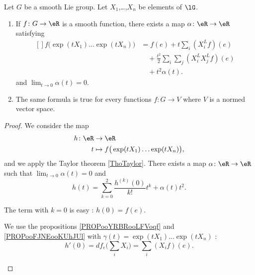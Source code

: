 \begin{theorem}
\begin{proposition}	\label{PROPooGTJLooSuAVGX}
	Let \( G\) be a smooth Lie group. Let \( X_1\),\ldots,\( X_n\) be elements of \( \lG\).
	\begin{enumerate}
		\item
		      If \(f \colon G\to \eR  \) is a smooth function, there exists a map \(\alpha \colon \eR\to \eR  \) satisfying
		      \begin{equation}		\label{EQooFQVUooXOMqEK}
			      \begin{aligned}[]
				      f\big( \exp(tX_1)\ldots \exp(tX_n) \big) & =f(e)+t\sum_i(X_i^Lf)(e)                             \\
				                                               & \quad+\frac{ t^2 }{ 2 } \sum_i\sum_j(X_i^LX_j^Lf)(e) \\
				                                               & \quad+t^2\alpha(t).
			      \end{aligned}
		      \end{equation}
		      and \( \lim_{t\to 0}\alpha(t)=0\).
		\item		\label{ITEMooQQOGooBhgChO}
		      The same formula is true for every functions \(f \colon G\to V  \) where \( V\) is a normed vector space.
	\end{enumerate}
\end{proposition}

\begin{proof}
	We consider the map
	\begin{equation}
		\begin{aligned}
			h\colon \eR & \to \eR                                           \\
			t           & \mapsto f\big( \exp(tX_1)\ldots \exp(tX_n) \big),
		\end{aligned}
	\end{equation}
	and we apply the Taylor theorem \ref{ThoTaylor}. There exists a map \(\alpha \colon \eR\to \eR  \) such that \( \lim_{t\to 0}\alpha(t)=0\) and
	\begin{equation}
		h(t)=\sum_{k=0}^2\frac{ h^{(k)}(0) }{ k! }t^k+\alpha(t)t^2.
	\end{equation}

	\begin{subproof}
		\spitem[Term \( k=0\)]
		The term with \( k=0\) is easy : \( h(0)=f(e)\).

		\spitem[Term \( k=1\)]
		We use the propositions \ref{PROPooYRBRooLFVoqf} and \ref{PROPooFJNEooKUhJUl} with \( \gamma(t)=\exp(tX_1)\ldots \exp(tX_n)\) :
		\begin{equation}
			h'(0)=df_e\big( \sum_iX_i \big)=\sum_i(X_if)(e).
		\end{equation}


\end{subproof}
\end{proof}
\end{theorem}
